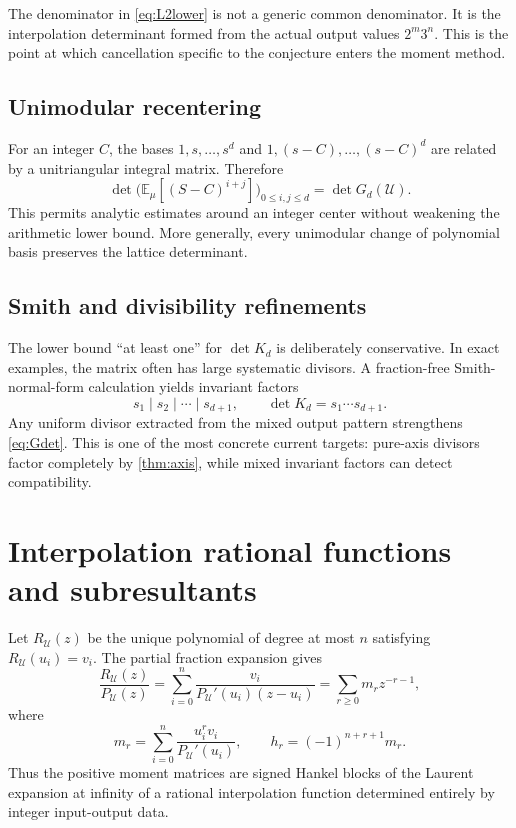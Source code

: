 \documentclass[11pt]{article}
\theoremstyle{definition}
\theoremstyle{remark}
\newcommand{\UU}{\mathcal U}
\begin{document}
The denominator in \eqref{eq:L2lower} is not a generic common denominator.  It is the
interpolation determinant formed from the actual output values $2^m3^n$.  This is the point
at which cancellation specific to the conjecture enters the moment method.

\subsection{Unimodular recentering}

For an integer $C$, the bases $1,s,\ldots,s^d$ and
$1,(s-C),\ldots,(s-C)^d$ are related by a unitriangular integral matrix.  Therefore
\begin{equation}\label{eq:centered}
 \det\bigl(\mathbb E_\mu[(S-C)^{i+j}]\bigr)_{0\le i,j\le d}
 =\det G_d(\UU).
\end{equation}
This permits analytic estimates around an integer center without weakening the arithmetic
lower bound.  More generally, every unimodular change of polynomial basis preserves the
lattice determinant.

\subsection{Smith and divisibility refinements}

The lower bound ``at least one'' for $\det K_d$ is deliberately conservative.  In exact
examples, the matrix often has large systematic divisors.  A fraction-free Smith-normal-form
calculation yields invariant factors
\[
 s_1\mid s_2\mid\cdots\mid s_{d+1},
 \qquad \det K_d=s_1\cdots s_{d+1}.
\]
Any uniform divisor extracted from the mixed output pattern strengthens \eqref{eq:Gdet}.
This is one of the most concrete current targets: pure-axis divisors factor completely by
\cref{thm:axis}, while mixed invariant factors can detect compatibility.

\section{Interpolation rational functions and subresultants}

Let $R_\UU(z)$ be the unique polynomial of degree at most $n$ satisfying
$R_\UU(u_i)=v_i$.  The partial fraction expansion gives
\begin{equation}\label{eq:RP}
 \frac{R_\UU(z)}{P_\UU(z)}
 =\sum_{i=0}^n\frac{v_i}{P_\UU'(u_i)(z-u_i)}
 =\sum_{r\ge0}m_rz^{-r-1},
\end{equation}
where
\begin{equation}\label{eq:mr}
 m_r=\sum_{i=0}^n\frac{u_i^rv_i}{P_\UU'(u_i)},
 \qquad h_r=(-1)^{n+r+1}m_r.
\end{equation}
Thus the positive moment matrices are signed Hankel blocks of the Laurent expansion at
infinity of a rational interpolation function determined entirely by integer input-output
data.
\end{document}
